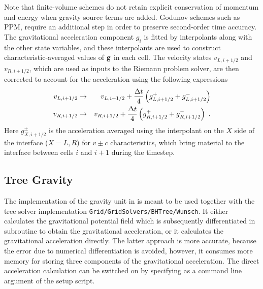 Note that finite-volume schemes do
not retain explicit conservation of momentum and energy when gravity
source terms are added. Godunov schemes such as PPM, require an
additional step in order to preserve second-order time accuracy. The
gravitational acceleration component $g_i$ is fitted by interpolants along
with the other state variables, and these interpolants are used to
construct characteristic-averaged values of ${\bf g}$ in each cell. The
velocity states $v_{L,i+1/2}$ and $v_{R,i+1/2}$, which are used as
inputs to the Riemann problem solver, are then corrected to account
for the acceleration using the following expressions
\begin{eqnarray}
\nonumber
v_{L,i+1/2} &\rightarrow& v_{L,i+1/2} + {\Delta t\over
4}\left(g^+_{L,i+1/2} +
  g^-_{L,i+1/2}\right)\\
v_{R,i+1/2} &\rightarrow& v_{R,i+1/2} + {\Delta t\over
4}\left(g^+_{R,i+1/2} +
  g^-_{R,i+1/2}\right)~.
\end{eqnarray}
Here $g^\pm_{X,i+1/2}$ is the acceleration averaged using the interpolant
on
the $X$ side of the interface ($X=L,R$) for $v\pm c$ characteristics, which
bring material to the interface between cells $i$ and $i+1$ during the
timestep.

\subsection{Tree Gravity}

The  implementation of the gravity unit in  is
meant to be used together with the tree solver implementation
\texttt{Grid/GridSolvers/BHTree/Wunsch}. It either calculates the gravitational
potential field which is subsequently differentiated in subroutine
 to obtain the gravitational acceleration, or it
calculates the gravitational acceleration directly. The latter approach is more
accurate, because the error due to numerical differentiation is avoided,
however, it consumes more memory for storing three components of the
gravitational acceleration. The direct acceleration calculation can be switched
on by specifying  as a command line argument of the setup
script.

